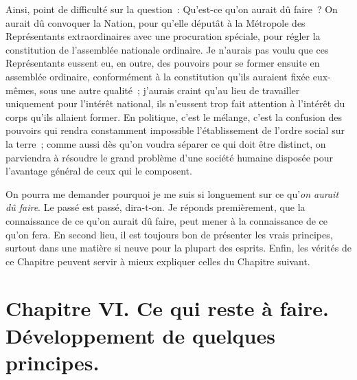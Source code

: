 \documentclass[french,twoside]{book} %
\newcommand\chapteropen{} %
\newcommand\chapterclose{} %
\begin{document}
Ainsi, point de difficulté sur la question : Qu’est-ce qu’on aurait dû faire ? On aurait dû convoquer la Nation, pour qu’elle députât à la Métropole des Représentants extraordinaires avec une procuration spéciale, pour régler la constitution de l’assemblée nationale ordinaire. Je n’aurais pas voulu que ces Représentants eussent eu, en outre, des pouvoirs pour se former ensuite en assemblée ordinaire, conformément à la constitution qu’ils auraient fixée eux-mêmes, sous une autre qualité ; j’aurais craint qu’au lieu de travailler uniquement pour l’intérêt national, ils n’eussent trop fait attention à l’intérêt du corps qu’ils allaient former. En politique, c’est le mélange, c’est la confusion des pouvoirs qui rendra constamment impossible l’établissement de l’ordre social sur la terre ; comme aussi dès qu’on voudra séparer ce qui doit être distinct, on parviendra à résoudre le grand problème d’une société humaine disposée pour l’avantage général de ceux qui le composent.\par
On pourra me demander pourquoi je me suis si longuement sur ce qu’{\itshape on aurait dû faire}. Le passé est passé, dira-t-on. Je réponds premièrement, que la connaissance de ce qu’on aurait dû faire, peut mener à la connaissance de ce qu’on fera. En second lieu, il est toujours bon de présenter les vrais principes, surtout dans une matière si neuve pour la plupart des esprits. Enfin, les vérités de ce Chapitre peuvent servir à mieux expliquer celles du Chapitre suivant.\par

\chapterclose


\chapteropen
\chapter[{Chapitre VI. Ce qui reste à faire. Développement de quelques principes.}]{Chapitre VI. Ce qui reste à faire. Développement de quelques principes.}\renewcommand{\leftmark}{Chapitre VI. Ce qui reste à faire. Développement de quelques principes.}
\end{document}
